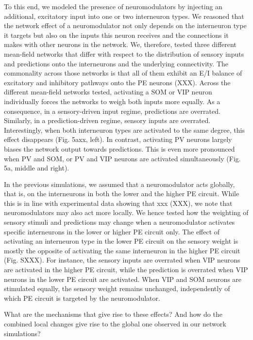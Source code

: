 \documentclass[10pt,a4paper,draft]{article}
\begin{document}
To this end, we modeled the presence of neuromodulators by injecting an additional, excitatory input into one or two interneuron types. We reasoned that the network effect of a neuromodulator not only depends on the interneuron type it targets but also on the inputs this neuron receives and the connections it makes with other neurons in the network. We, therefore, tested three different mean-field networks that differ with respect to the distribution of sensory inputs and predictions onto the interneurons and the underlying connectivity. The commonality across those networks is that all of them exhibit an E/I balance of excitatory and inhibitory pathways onto the PE neurons (XXX). Across the different mean-field networks tested, activating a SOM or VIP neuron individually forces the networks to weigh both inputs more equally. As a consequence, in a sensory-driven input regime, predictions are overrated. Similarly, in a prediction-driven regime, sensory inputs are overrated. Interestingly, when both interneuron types are activated to the same degree, this effect disappears (Fig. 5axx, left). In contrast, activating PV neurons largely biases the network output towards predictions. This is even more pronounced when PV and SOM, or PV and VIP neurons are activated simultaneously (Fig. 5a, middle and right). 

In the previous simulations, we assumed that a neuromodulator acts globally, that is, on the interneurons in both the lower and the higher PE circuit. While this is in line with experimental data showing that xxx (XXX), we note that neuromodulators may also act more locally. We hence tested how the weighting of sensory stimuli and predictions may change when a neuromodulator activates specific interneurons in the lower or higher PE circuit only. The effect of activating an interneuron type in the lower PE circuit on the sensory weight is mostly the opposite of activating the same interneuron in the higher PE circuit (Fig. SXXX). For instance, the sensory inputs are overrated when VIP neurons are activated in the higher PE circuit, while the prediction is overrated when VIP neurons in the lower PE circuit are activated. When VIP and SOM neurons are stimulated equally, the sensory weight remains unchanged, independently of which PE circuit is targeted by the neuromodulator. 

What are the mechanisms that give rise to these effects? And how do the combined local changes give rise to the global one observed in our network simulations?

\end{document}
